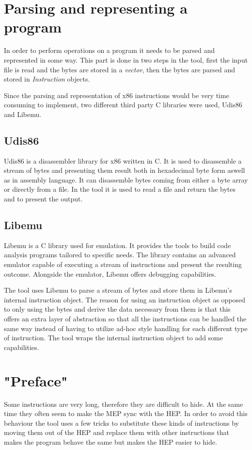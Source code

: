 \documentclass[11pt,twoside]{eitExjobb}
\begin{document}
\section{Parsing and representing a program}
In order to perform operations on a program it needs to be parsed and represented in some way. This part is done in two steps in the tool, first the input file is read and the bytes are stored in a \emph{vector}, then the bytes are parsed and stored in \emph{Instruction} objects. 

Since the parsing and representation of x86 instructions would be very time consuming to implement, two different third party C libraries were used, Udis86 and Libemu. 

\subsection{Udis86}
Udis86 is a disassembler library for x86 written in C. It is used to disassemble a stream of bytes and presenting them result both in hexadecimal byte form aswell as in assembly language. It can disassemble bytes coming from either a byte array or directly from a file. In the tool it is used to read a file and return the bytes and to present the output.\cite{udis}


\subsection{Libemu}
Libemu is a C library used for emulation. It provides the tools to build code analysis programs tailored to specific needs. The library contains an advanced emulator capable of executing a stream of instructions and present the resulting outcome. Alongside the emulator, Libemu offers debugging capabilities.

The tool uses Libemu to parse a stream of bytes and store them in Libemu's internal instruction object. The reason for using an instruction object as opposed to only using the bytes and derive the data necessary from them is that this offers an extra layer of abstraction so that all the instructions can be handled the same way instead of having to utilize ad-hoc style handling for each different type of instruction. The tool wraps the internal instruction object to add some capabilities.\cite{libemu}

\section{"Preface"}
Some instructions are very long, therefore they are difficult to hide. At the same time they often seem to make the MEP sync with the HEP. In order to avoid this behaviour the tool uses a few tricks to substitute these kinds of instructions by moving them out of the HEP and replace them with other instructions that makes the program behave the same but makes the HEP easier to hide. 
\end{document}
